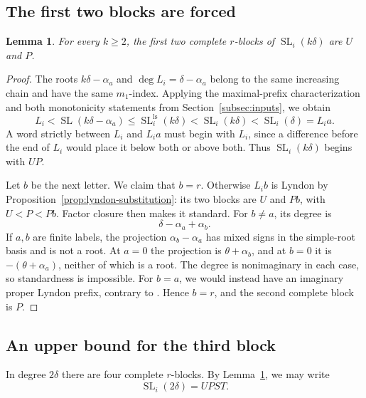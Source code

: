 \documentclass[11pt]{amsart}
\numberwithin{equation}{section}
\newtheorem{lemma}[theorem]{Lemma}
\theoremstyle{definition}
\DeclareMathOperator{\SL}{SL}
\newcommand{\ls}{\mathrm{ls}}
\begin{document}
\subsection{The first two blocks are forced}\label{subsec:first-blocks}

\begin{lemma}\label{lem:first-blocks}
For every $k\geq2$, the first two complete $r$-blocks of $\SL_i(k\delta)$ are $U$ and $P$.
\end{lemma}
\begin{proof}
The roots $k\delta-\alpha_a$ and $\deg L_i=\delta-\alpha_a$ belong to the same increasing chain and have the same $m_1$-index. Applying the maximal-prefix characterization and both monotonicity statements from Section~\ref{subsec:inputs}, we obtain
\begin{equation}\label{eq:prefix-interval}
 L_i<\SL(k\delta-\alpha_a)
 \leq\SL_i^{\ls}(k\delta)
 <\SL_i(k\delta)<\SL_i(\delta)=L_i a.
\end{equation}
A word strictly between $L_i$ and $L_i a$ must begin with $L_i$, since a difference before the end of $L_i$ would place it below both or above both. Thus $\SL_i(k\delta)$ begins with $UP$.

Let $b$ be the next letter. We claim that $b=r$. Otherwise $L_i b$ is Lyndon by Proposition~\ref{prop:lyndon-substitution}: its two blocks are $U$ and $Pb$, with $U<P<Pb$. Factor closure then makes it standard. For $b\ne a$, its degree is
\[
 \delta-\alpha_a+\alpha_b.
\]
If $a,b$ are finite labels, the projection $\alpha_b-\alpha_a$ has mixed signs in the simple-root basis and is not a root. At $a=0$ the projection is $\theta+\alpha_b$, and at $b=0$ it is $-(\theta+\alpha_a)$, neither of which is a root. The degree is nonimaginary in each case, so standardness is impossible. For $b=a$, we would instead have an imaginary proper Lyndon prefix, contrary to \cite[Corollary~4.24(3)]{ETC}. Hence $b=r$, and the second complete block is $P$.
\end{proof}

\subsection{An upper bound for the third block}\label{subsec:third-block}

In degree $2\delta$ there are four complete $r$-blocks. By Lemma~\ref{lem:first-blocks}, we may write
\begin{equation}\label{eq:four-block-word}
 \SL_i(2\delta)=UPST.
\end{equation}
\end{document}
